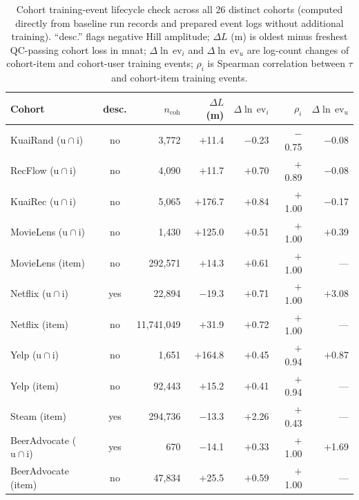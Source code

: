 \documentclass[10pt,letterpaper]{article}
\begin{document}
\begin{table}[t]
\centering
\caption{Cohort training-event lifecycle check across all 26 distinct cohorts
(computed directly from baseline run records and prepared event logs without
additional training). ``desc.'' flags negative Hill amplitude; $\Delta L$ (m) is
oldest minus freshest QC-passing cohort loss in mnat;
$\Delta\ln\,\mathrm{ev}_i$ and $\Delta\ln\,\mathrm{ev}_u$ are log-count changes
of cohort-item and cohort-user training events; $\rho_i$ is Spearman correlation
between $\tau$ and cohort-item training events.}
\label{tab:lifecycle26}
\scriptsize
\setlength{\tabcolsep}{4pt}
\begin{tabular}{lcrrrrr}
\toprule
Cohort & desc. & $n_{\mathrm{coh}}$ & $\Delta L$ (m) & $\Delta\ln\,\mathrm{ev}_i$ & $\rho_i$ & $\Delta\ln\,\mathrm{ev}_u$ \\
\midrule
KuaiRand ($\mathrm{u}{\cap}\mathrm{i}$)        & no  &       3{,}772 &  $+$11.4 & $-$0.23 & $-$0.75 & $-$0.08 \\
RecFlow ($\mathrm{u}{\cap}\mathrm{i}$)         & no  &       4{,}090 &  $+$11.7 & $+$0.70 & $+$0.89 & $-$0.08 \\
KuaiRec ($\mathrm{u}{\cap}\mathrm{i}$)         & no  &       5{,}065 & $+$176.7 & $+$0.84 & $+$1.00 & $-$0.17 \\
MovieLens ($\mathrm{u}{\cap}\mathrm{i}$)       & no  &       1{,}430 & $+$125.0 & $+$0.51 & $+$1.00 & $+$0.39 \\
MovieLens (item)                              & no  &     292{,}571 &  $+$14.3 & $+$0.61 & $+$1.00 & --- \\
Netflix ($\mathrm{u}{\cap}\mathrm{i}$)         & yes &      22{,}894 &  $-$19.3 & $+$0.71 & $+$1.00 & $+$3.08 \\
Netflix (item)                                & no  & 11{,}741{,}049 &  $+$31.9 & $+$0.72 & $+$1.00 & --- \\
Yelp ($\mathrm{u}{\cap}\mathrm{i}$)            & no  &       1{,}651 & $+$164.8 & $+$0.45 & $+$0.94 & $+$0.87 \\
Yelp (item)                                   & no  &      92{,}443 &  $+$15.2 & $+$0.41 & $+$0.94 & --- \\
Steam (item)                                  & yes &     294{,}736 &  $-$13.3 & $+$2.26 & $+$0.43 & --- \\
BeerAdvocate ($\mathrm{u}{\cap}\mathrm{i}$)    & yes &           670 &  $-$14.1 & $+$0.33 & $+$1.00 & $+$1.69 \\
BeerAdvocate (item)                           & no  &      47{,}834 &  $+$25.5 & $+$0.59 & $+$1.00 & --- \\

\end{tabular}
\end{table}
\end{document}
